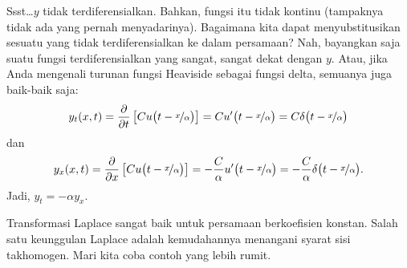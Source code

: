\begin{example}
\begin{myfig}
\capstart
{}
\caption{Muka gelombang zat beracun adalah garis berkemiringan
$\nicefrac{1}{\alpha}$.\label{lt:half-infinite-goo-river-wavefront}}
\end{myfig}


Ssst\ldots $y$ tidak terdiferensialkan.
Bahkan, fungsi itu tidak kontinu
(tampaknya tidak ada yang pernah menyadarinya).  Bagaimana kita dapat menyubstitusikan sesuatu yang tidak
terdiferensialkan ke dalam persamaan?
Nah, bayangkan saja suatu fungsi terdiferensialkan yang sangat, sangat dekat dengan $y$.
Atau, jika Anda mengenali turunan fungsi Heaviside sebagai fungsi
delta, semuanya juga baik-baik saja:
\begin{equation*}
y_t (x,t) = \frac{\partial}{\partial t} \left[
C  u\bigl(t-\nicefrac{x}{\alpha}\bigr)
\right]
=
C  u'\bigl(t-\nicefrac{x}{\alpha}\bigr)
=
C \delta\bigl(t-\nicefrac{x}{\alpha}\bigr)
\end{equation*}
dan
\begin{equation*}
y_x (x,t) = \frac{\partial}{\partial x} \left[
C  u\bigl(t-\nicefrac{x}{\alpha}\bigr)
\right]
=
- \frac{C}{\alpha}  u'\bigl(t-\nicefrac{x}{\alpha}\bigr)
=
- \frac{C}{\alpha} \delta\bigl(t-\nicefrac{x}{\alpha}\bigr) .
\end{equation*}
Jadi, $y_t = - \alpha y_x$.
\end{example}

Transformasi Laplace sangat baik untuk persamaan berkoefisien konstan.  Salah satu
keunggulan Laplace adalah kemudahannya menangani
syarat sisi takhomogen.
Mari kita coba contoh yang lebih rumit.

